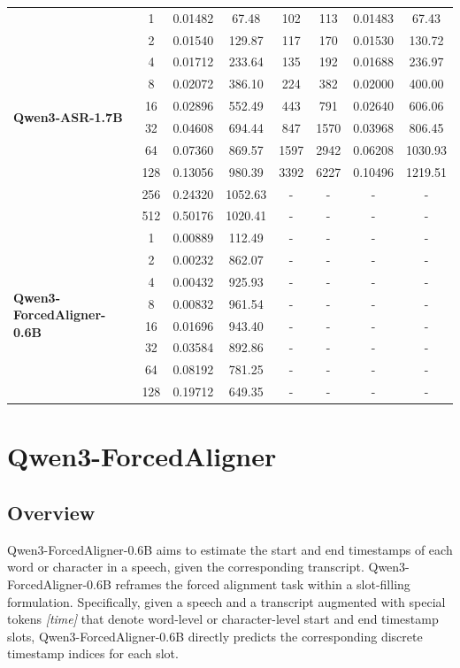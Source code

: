 \begin{table}[ht]
{\begin{tabular}{lccccccc}
\multirow{10}{*}{\textbf{Qwen3-ASR-1.7B}}
 & 1   & 0.01482 & 67.48   & 102  & 113  & 0.01483 & 67.43   \\
 & 2   & 0.01540 & 129.87  & 117  & 170  & 0.01530 & 130.72  \\
 & 4   & 0.01712 & 233.64  & 135  & 192  & 0.01688 & 236.97  \\
 & 8   & 0.02072 & 386.10  & 224  & 382  & 0.02000 & 400.00  \\
 & 16  & 0.02896 & 552.49  & 443  & 791  & 0.02640 & 606.06  \\
 & 32  & 0.04608 & 694.44  & 847  & 1570 & 0.03968 & 806.45  \\
 & 64  & 0.07360 & 869.57  & 1597 & 2942 & 0.06208 & 1030.93 \\
 & 128 & 0.13056 & 980.39  & 3392 & 6227 & 0.10496 & 1219.51 \\
 & 256 & 0.24320 & 1052.63 & -   & -   & -      & -      \\
 & 512 & 0.50176 & 1020.41 & -   & -   & -      & -      \\
\midrule

\multirow{8}{*}{\textbf{Qwen3-ForcedAligner-0.6B}}
 & 1   & 0.00889 & 112.49  & - & - & - & - \\
 & 2   & 0.00232 & 862.07  & - & - & - & - \\
 & 4   & 0.00432 & 925.93  & - & - & - & - \\
 & 8   & 0.00832 & 961.54  & - & - & - & - \\
 & 16  & 0.01696 & 943.40  & - & - & - & - \\
 & 32  & 0.03584 & 892.86  & - & - & - & - \\
 & 64  & 0.08192 & 781.25  & - & - & - & - \\
 & 128 & 0.19712 & 649.35  & - & - & - & - \\
\bottomrule
\end{tabular}
}
\end{table}

\section{Qwen3-ForcedAligner}
\subsection{Overview}
Qwen3-ForcedAligner-0.6B aims to estimate the start and end timestamps of each word or character in a speech, given the corresponding transcript.
Qwen3-ForcedAligner-0.6B reframes the forced alignment task within a slot-filling formulation. Specifically, given a speech and a transcript augmented with special tokens \textit{[time]} that denote word-level or character-level start and end timestamp slots, Qwen3-ForcedAligner-0.6B directly predicts the corresponding discrete timestamp indices for each slot.

